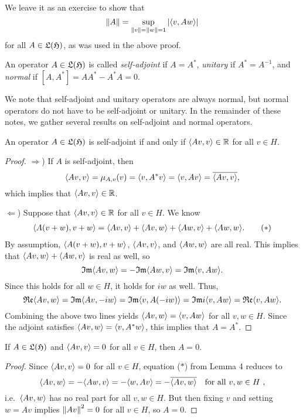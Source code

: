 We leave it as an exercise to show that
\[
\left\|A\right\| = \sup_{\left\|v\right\| = \left\|w\right\| = 1} {\left|\langle v, Aw \rangle\right|}
\]
for all $A \in \mathfrak{L} (\mathfrak{H})$, as was used in the above proof.


\begin{definition}
An operator $A \in \mathfrak{L} (\mathfrak{H})$ is called \emph{self-adjoint} if $A = A^*$, \emph{unitary} if $A^* = A^{-1}$, and \emph{normal} if $[A, A^*] = AA^* - A^*A = 0$.
\end{definition}


We note that self-adjoint and unitary operators are always normal, but normal operators do not have to be self-adjoint or unitary. In the remainder of these notes, we gather several results on self-adjoint and normal operators.

\begin{lemma}
An operator $A \in \mathfrak{L} (\mathfrak{H})$ is self-adjoint if and only if $\langle Av, v \rangle \in \mathbb{R}$ for all $v \in H$.
\end{lemma}

\begin{proof}
$\Rightarrow$) If $A$ is self-adjoint, then
\[
\langle Av, v \rangle = \mu_{A,v}(v) = \langle v, A^*v \rangle = \langle v, Av \rangle = \overline{\langle Av,v \rangle},
\]
which implies that $\langle Av,v \rangle \in \mathbb{R}$.

$\Leftarrow$) Suppose that $\langle Av, v \rangle \in \mathbb{R}$ for all $v \in H$. We know
\begin{align*}
\langle A(v+w), v+w \rangle = \langle Av, v \rangle + \langle Av, w \rangle + \langle Aw, v \rangle + \langle Aw, w \rangle. \tag{$*$}
\end{align*}
By assumption, $\langle A(v+w), v+w \rangle$, $\langle Av, v \rangle$, and $\langle Aw, w \rangle$ are all real. This implies that $\langle Av, w \rangle + \langle Aw, v \rangle$ is real as well, so
\[
\mathfrak{Im} \langle Av, w \rangle = -\mathfrak{Im} \langle Aw, v \rangle= \mathfrak{Im} \langle v, Aw \rangle.
\]
Since this holds for all $w \in H$, it holds for $iw$ as well. Thus,
\[
\mathfrak{Re} \langle Av, w \rangle = \mathfrak{Im} \langle Av, -iw \rangle = \mathfrak{Im} \langle v, A(-iw) \rangle = \mathfrak{Im} i\langle v, Aw \rangle = \mathfrak{Re} \langle v, Aw \rangle.
\]
Combining the above two lines yields $\langle Av, w \rangle = \langle v, Aw \rangle$ for all $v, w \in H$. Since the adjoint satisfies $\langle Av, w \rangle = \langle v, A^*w \rangle$, this implies that $A = A^*$.
\end{proof}

\begin{proposition}
If $A \in \mathfrak{L} (\mathfrak{H})$ and $\langle Av, v \rangle = 0$ for all $v \in H$, then $A = 0$.
\end{proposition}

\begin{proof}
Since $\langle Av, v \rangle = 0$ for all $v \in H$, equation ($*$) from Lemma 4 reduces to
\[
\langle Av, w \rangle = -\langle Aw, v \rangle = -\langle w, Av \rangle = -\overline{\langle Av, w \rangle} \quad \text{for all } v, w \in H \ ,
\]
i.e.\ $\langle Av,w \rangle$ has no real part for all $v, w \in H$. But then fixing $v$ and setting $w = Av$ implies $\left\|Av\right\|^2 = 0$ for all $v \in H$, so $A = 0$.
\end{proof}

